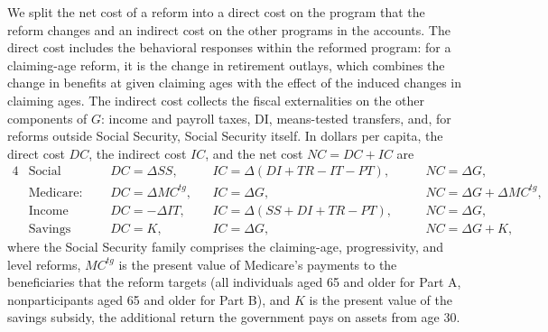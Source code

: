 We split the net cost of a reform into a direct cost on the program that the reform changes and an indirect cost on the other programs in the accounts. The direct cost includes the behavioral responses within the reformed program: for a claiming-age reform, it is the change in retirement outlays, which combines the change in benefits at given claiming ages with the effect of the induced changes in claiming ages. The indirect cost collects the fiscal externalities on the other components of $G$: income and payroll taxes, DI, means-tested transfers, and, for reforms outside Social Security, Social Security itself. In dollars per capita, the direct cost $\mathit{DC}$, the indirect cost $\mathit{IC}$, and the net cost $\mathit{NC}=\mathit{DC}+\mathit{IC}$ are
\begin{alignat*}{4}
&\text{Social Security:}\quad &&\mathit{DC}=\Delta\mathit{SS}, \quad &&\mathit{IC}=\Delta(\mathit{DI}+\mathit{TR}-\mathit{IT}-\mathit{PT}), \quad &&\mathit{NC}=\Delta G,\\
&\text{Medicare:} &&\mathit{DC}=\Delta\mathit{MC}^{tg}, &&\mathit{IC}=\Delta G, &&\mathit{NC}=\Delta G+\Delta\mathit{MC}^{tg},\\
&\text{Income tax:} &&\mathit{DC}=-\Delta\mathit{IT}, &&\mathit{IC}=\Delta(\mathit{SS}+\mathit{DI}+\mathit{TR}-\mathit{PT}), \quad &&\mathit{NC}=\Delta G,\\
&\text{Savings subsidy:} &&\mathit{DC}=K, &&\mathit{IC}=\Delta G, &&\mathit{NC}=\Delta G+K,
\end{alignat*}
where the Social Security family comprises the claiming-age, progressivity, and level reforms, $\mathit{MC}^{tg}$ is the present value of Medicare's payments to the beneficiaries that the reform targets (all individuals aged 65 and older for Part A, nonparticipants aged 65 and older for Part B), and $K$ is the present value of the savings subsidy, the additional return the government pays on assets from age 30.

